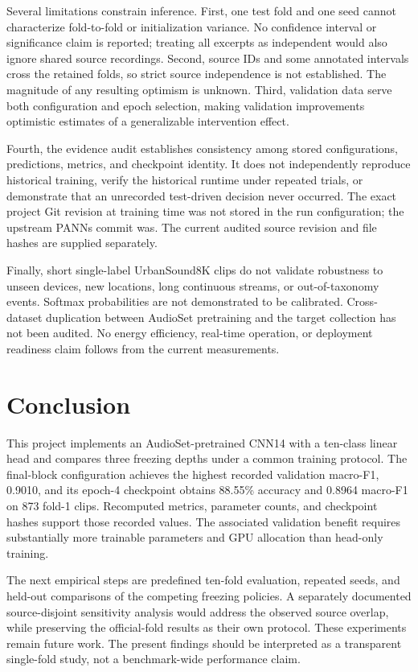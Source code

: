 \documentclass[conference]{IEEEtran}
\begin{document}
Several limitations constrain inference. First, one test fold and one seed cannot characterize fold-to-fold or initialization variance. No confidence interval or significance claim is reported; treating all excerpts as independent would also ignore shared source recordings. Second, source IDs and some annotated intervals cross the retained folds, so strict source independence is not established. The magnitude of any resulting optimism is unknown. Third, validation data serve both configuration and epoch selection, making validation improvements optimistic estimates of a generalizable intervention effect.

Fourth, the evidence audit establishes consistency among stored configurations, predictions, metrics, and checkpoint identity. It does not independently reproduce historical training, verify the historical runtime under repeated trials, or demonstrate that an unrecorded test-driven decision never occurred. The exact project Git revision at training time was not stored in the run configuration; the upstream PANNs commit was. The current audited source revision and file hashes are supplied separately.

Finally, short single-label UrbanSound8K clips do not validate robustness to unseen devices, new locations, long continuous streams, or out-of-taxonomy events. Softmax probabilities are not demonstrated to be calibrated. Cross-dataset duplication between AudioSet pretraining and the target collection has not been audited. No energy efficiency, real-time operation, or deployment readiness claim follows from the current measurements.

\section{Conclusion}\label{sec:conclusion}
This project implements an AudioSet-pretrained CNN14 with a ten-class linear head and compares three freezing depths under a common training protocol. The final-block configuration achieves the highest recorded validation macro-F1, 0.9010, and its epoch-4 checkpoint obtains 88.55\% accuracy and 0.8964 macro-F1 on 873 fold-1 clips. Recomputed metrics, parameter counts, and checkpoint hashes support those recorded values. The associated validation benefit requires substantially more trainable parameters and GPU allocation than head-only training.

The next empirical steps are predefined ten-fold evaluation, repeated seeds, and held-out comparisons of the competing freezing policies. A separately documented source-disjoint sensitivity analysis would address the observed source overlap, while preserving the official-fold results as their own protocol. These experiments remain future work. The present findings should be interpreted as a transparent single-fold study, not a benchmark-wide performance claim.

\appendices

\balance


\end{document}

